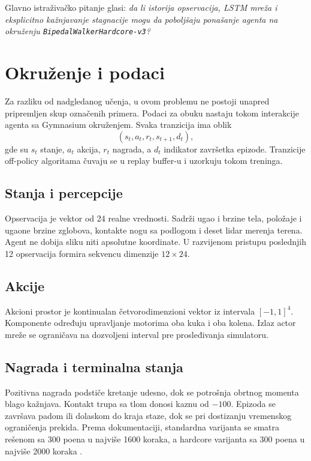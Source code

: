 \documentclass[11pt,a4paper]{article}
\begin{document}
Glavno istraživačko pitanje glasi: \emph{da li istorija opservacija, LSTM
mreža i eksplicitno kažnjavanje stagnacije mogu da poboljšaju ponašanje
agenta na okruženju \texttt{BipedalWalkerHardcore-v3}?}

\section{Okruženje i podaci}

Za razliku od nadgledanog učenja, u ovom problemu ne postoji unapred
pripremljen skup označenih primera. Podaci za obuku nastaju tokom
interakcije agenta sa Gymnasium okruženjem. Svaka tranzicija ima oblik
\[
  (s_t,a_t,r_t,s_{t+1},d_t),
\]
gde su \(s_t\) stanje, \(a_t\) akcija, \(r_t\) nagrada, a \(d_t\)
indikator završetka epizode. Tranzicije off-policy algoritama čuvaju se
u replay buffer-u i uzorkuju tokom treninga.

\subsection{Stanja i percepcije}

Opservacija je vektor od 24 realne vrednosti. Sadrži ugao i brzine tela,
položaje i ugaone brzine zglobova, kontakte nogu sa podlogom i deset
lidar merenja terena. Agent ne dobija sliku niti apsolutne koordinate.
U razvijenom pristupu poslednjih 12 opservacija formira sekvencu dimenzije
\(12\times24\).

\subsection{Akcije}

Akcioni prostor je kontinualan četvorodimenzioni vektor iz intervala
\([-1,1]^4\). Komponente određuju upravljanje motorima oba kuka i oba
kolena. Izlaz actor mreže se ograničava na dozvoljeni interval pre
prosleđivanja simulatoru.

\subsection{Nagrada i terminalna stanja}

Pozitivna nagrada podstiče kretanje udesno, dok se potrošnja obrtnog
momenta blago kažnjava. Kontakt trupa sa tlom donosi kaznu od \(-100\).
Epizoda se završava padom ili dolaskom do kraja staze, dok se pri
dostizanju vremenskog ograničenja prekida. Prema dokumentaciji,
standardna varijanta se smatra rešenom sa 300 poena u najviše 1600
koraka, a hardcore varijanta sa 300 poena u najviše 2000 koraka
\cite{gymnasium}.
\end{document}
